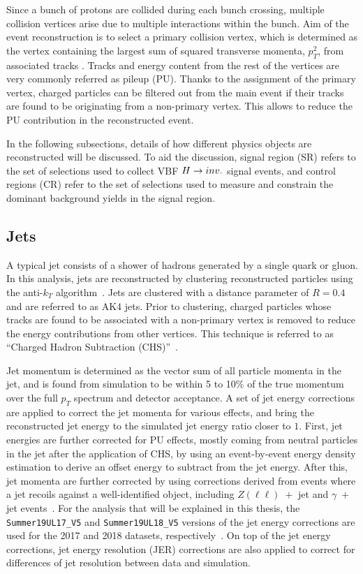 Since a bunch of protons are collided during each bunch crossing, multiple collision vertices arise
due to multiple interactions within the bunch. Aim of the event reconstruction is to select a primary
collision vertex, which is determined as the vertex containing the largest sum of squared transverse momenta,
$p_{T}^2$, from associated tracks \cite{cms:phase2_upgrade}.
Tracks and energy content from the rest of the vertices are very commonly referred as pileup (PU). Thanks to the assignment of the
primary vertex, charged particles can be filtered out from the main event if their tracks are found to be originating 
from a non-primary vertex. This allows to reduce the PU contribution in the reconstructed event. 

In the following subsections, details of how different physics objects are reconstructed will be discussed. To aid the
discussion, signal region (SR) refers to the set of selections used to collect VBF $H \rightarrow inv.$ signal events,
and control regions (CR) refer to the set of selections used to measure and constrain the dominant background yields
in the signal region.

\subsection{Jets}
\label{sec:objects_jets}

A typical jet consists of a shower of hadrons generated by a single quark or gluon.
In this analysis, jets are reconstructed by clustering reconstructed particles
using the anti-$k_{T}$ algorithm~\cite{Cacciari:2008gp}. Jets are
clustered with a distance parameter of $R = 0.4$ and are referred to as AK4
jets. Prior to clustering, charged particles whose tracks are found to be associated
with a non-primary vertex is removed to reduce the energy contributions from other
vertices. This technique is referred to as ``Charged Hadron Subtraction (CHS)''~\cite{CMS:2014ata}. 

Jet momentum is determined as the vector sum of all particle momenta
in the jet, and is found from simulation to be within 5 to 10\% of the
true momentum over the full $p_{T}$ spectrum and detector acceptance. 
A set of jet energy corrections are applied to correct the jet momenta for various effects,
and bring the reconstructed jet energy to the simulated jet energy ratio closer to $1$.
First, jet energies are further corrected for PU effects, mostly coming from neutral 
particles in the jet after the application of CHS, by using an event-by-event energy density estimation
to derive an offset energy to subtract from the jet energy.
After this, jet momenta are further corrected by using corrections derived from events
where a jet recoils against a well-identified object, including $Z(\ell\ell)\;+$ jet and
$\gamma\;+$ jet events~\cite{Khachatryan:2016kdb}. 
For the analysis that will be explained in this thesis, the
\texttt{Summer19UL17\_V5} and \texttt{Summer19UL18\_V5} versions of
the jet energy corrections are used for the 2017 and 2018 datasets,
respectively~\cite{JME:JECRecommendations}. On top of the jet energy corrections,
jet energy resolution (JER) corrections are also applied to correct for differences of 
jet resolution between data and simulation.

